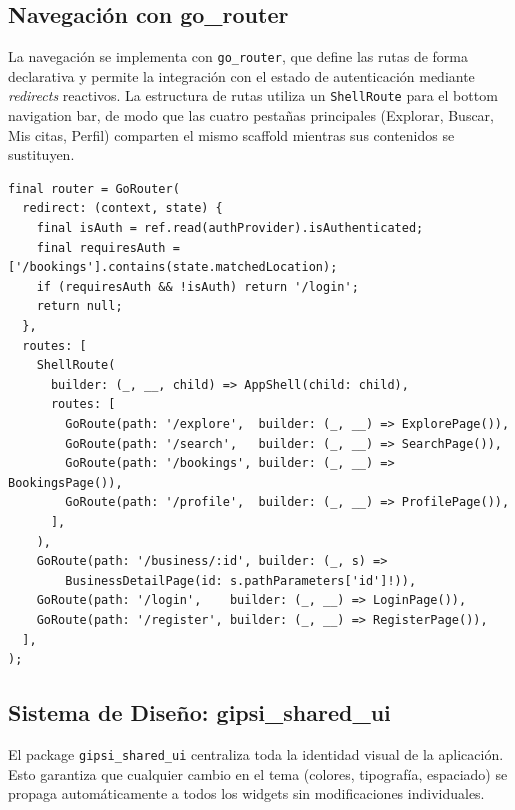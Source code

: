 \documentclass[12pt,a4paper,twoside]{report}
\begin{document}
\subsection{Navegación con go\_router}

La navegación se implementa con \texttt{go\_router}, que define las rutas de forma declarativa y permite la integración con el estado de autenticación mediante \textit{redirects} reactivos. La estructura de rutas utiliza un \texttt{ShellRoute} para el bottom navigation bar, de modo que las cuatro pestañas principales (Explorar, Buscar, Mis citas, Perfil) comparten el mismo scaffold mientras sus contenidos se sustituyen.

\begin{lstlisting}[style=dartStyle, caption={Esquema simplificado de rutas con go\_router}, label={lst:router}]
final router = GoRouter(
  redirect: (context, state) {
    final isAuth = ref.read(authProvider).isAuthenticated;
    final requiresAuth = ['/bookings'].contains(state.matchedLocation);
    if (requiresAuth && !isAuth) return '/login';
    return null;
  },
  routes: [
    ShellRoute(
      builder: (_, __, child) => AppShell(child: child),
      routes: [
        GoRoute(path: '/explore',  builder: (_, __) => ExplorePage()),
        GoRoute(path: '/search',   builder: (_, __) => SearchPage()),
        GoRoute(path: '/bookings', builder: (_, __) => BookingsPage()),
        GoRoute(path: '/profile',  builder: (_, __) => ProfilePage()),
      ],
    ),
    GoRoute(path: '/business/:id', builder: (_, s) =>
        BusinessDetailPage(id: s.pathParameters['id']!)),
    GoRoute(path: '/login',    builder: (_, __) => LoginPage()),
    GoRoute(path: '/register', builder: (_, __) => RegisterPage()),
  ],
);
\end{lstlisting}

\subsection{Sistema de Diseño: gipsi\_shared\_ui}

El package \texttt{gipsi\_shared\_ui} centraliza toda la identidad visual de la aplicación. Esto garantiza que cualquier cambio en el tema (colores, tipografía, espaciado) se propaga automáticamente a todos los widgets sin modificaciones individuales.
\end{document}
